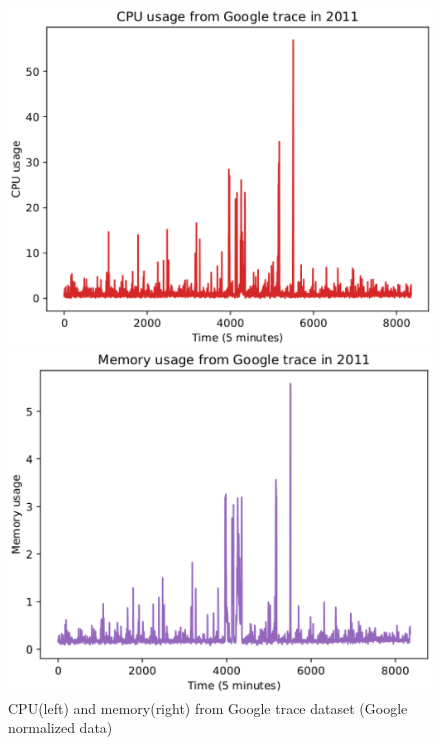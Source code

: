 \documentclass[runningheads]{llncs}
\begin{document}
\begin{figure}
	\centering
	\begin{minipage}[t]{6cm}
		\centering
		\includegraphics[width=1\textwidth]{images/pdf/google_cpu_5m.eps}
	\end{minipage}
	\begin{minipage}[t]{6cm}
		\centering
		\includegraphics[width=1\textwidth]{images/pdf/google_ram_5m.eps}
	\end{minipage}
	\caption{CPU(left) and memory(right) from Google trace dataset (Google normalized data) } 
	\label{fig_dataset}
\end{figure}
\end{document}
